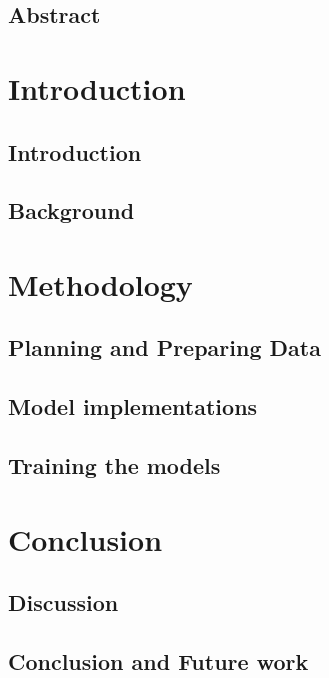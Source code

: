 \documentclass[UKenglish]{ifimaster}
\title{\problemStatement}
\subtitle{
}
\author{Joakim I. Frogner}
\begin{document}
\duoforside[dept={Department of Informatics},
program={Programming and Networks},
long]

\frontmatter{}
\chapter*{Abstract}


\tableofcontents{} 
\listoffigures{}
\listoftables{}

\mainmatter{}
\part{Introduction}

\chapter{Introduction}


\chapter{Background}



\part{Methodology}
\chapter{Planning and Preparing Data}


\chapter{Model implementations}


\chapter{Training the models}


\part{Conclusion}
\chapter{Discussion}


\chapter{Conclusion and Future work}


\backmatter{}
\printbibliography
\end{document}
